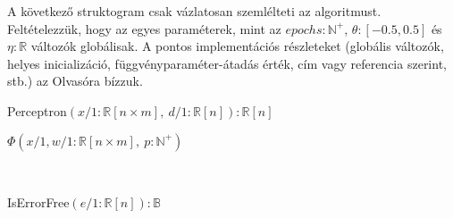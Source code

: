 \documentclass[a4paper, 11pt]{article}
\begin{document}
\begin{footnotesize}
	\setlength{\stmheight}{14pt}
	
	A következő struktogram csak vázlatosan szemlélteti az algoritmust. Feltételezzük, hogy az egyes paraméterek, mint az $epochs : \mathbb{N}^+$, $\theta : [-0.5, 0.5]$ és $\eta : \mathbb{R}$ változók globálisak. A pontos implementációs részleteket (globális változók, helyes inicializáció, függvényparaméter-átadás érték, cím vagy referencia szerint, stb.) az Olvasóra bízzuk.
	
	\begin{minipage}{0.7\linewidth}
		\begin{stuki*}{Perceptron$\left( x / 1 : \mathbb{R}[n \times m], ~ d/1 : \mathbb{R}[n] \right) : \mathbb{R}[n]$}
			\begin{WHILE}{1}{}
			\end{WHILE}
			\begin{WHILE}{7}{}
				\begin{WHILE}{5}{}
					\begin{WHILE}{2}{}
					\end{WHILE}
				\end{WHILE}
			\end{WHILE}
		\end{stuki*}
	\end{minipage}
	\begin{minipage}{0.3\linewidth}
		\begin{stuki*}[5cm]{$\Phi(x / 1, w/1 : \mathbb{R}[n \times m], ~ p : \mathbb{N}^+ )$}
			\begin{WHILE}{1}{}
			\end{WHILE}
		\end{stuki*}
		
		~\\
		
		\begin{stuki*}[5cm]{IsErrorFree$(e / 1 : \mathbb{R}[n]) : \mathbb{B}$}
			\begin{WHILE}{1}{}
			\end{WHILE}
		\end{stuki*}
	\end{minipage}
\end{footnotesize}
\end{document}
